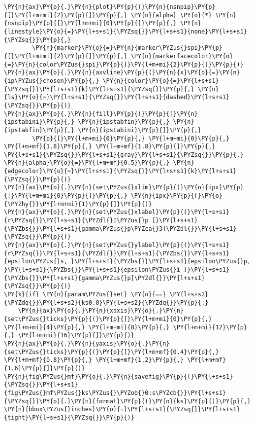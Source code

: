 \begin{Verbatim}[commandchars=\\\{\}]
\PY{n}{ax}\PY{o}{.}\PY{n}{plot}\PY{p}{(}\PY{n}{nsnpip}\PY{p}{[}\PY{l+m+mi}{2}\PY{p}{]}\PY{p}{,} \PY{n}{alpha} \PY{o}{*} \PY{n}{nsnpip}\PY{p}{[}\PY{l+m+mi}{0}\PY{p}{]}\PY{p}{,} \PY{n}{linestyle}\PY{o}{=}\PY{l+s+s1}{\PYZsq{}}\PY{l+s+s1}{none}\PY{l+s+s1}{\PYZsq{}}\PY{p}{,}
        \PY{n}{marker}\PY{o}{=}\PY{n}{marker\PYZus{}spi}\PY{p}{[}\PY{l+m+mi}{2}\PY{p}{]}\PY{p}{,} \PY{n}{markerfacecolor}\PY{o}{=}\PY{n}{color\PYZus{}spi}\PY{p}{[}\PY{l+m+mi}{2}\PY{p}{]}\PY{p}{)}
\PY{n}{ax}\PY{o}{.}\PY{n}{axvline}\PY{p}{(}\PY{n}{x}\PY{o}{=}\PY{n}{ip\PYZus{}chosen}\PY{p}{,} \PY{n}{color}\PY{o}{=}\PY{l+s+s1}{\PYZsq{}}\PY{l+s+s1}{k}\PY{l+s+s1}{\PYZsq{}}\PY{p}{,} \PY{n}{ls}\PY{o}{=}\PY{l+s+s1}{\PYZsq{}}\PY{l+s+s1}{dashed}\PY{l+s+s1}{\PYZsq{}}\PY{p}{)}
\PY{n}{ax}\PY{o}{.}\PY{n}{fill}\PY{p}{(}\PY{p}{[}\PY{n}{ipstabini}\PY{p}{,} \PY{n}{ipstabfin}\PY{p}{,} \PY{n}{ipstabfin}\PY{p}{,} \PY{n}{ipstabini}\PY{p}{]}\PY{p}{,}
        \PY{p}{[}\PY{l+m+mi}{0}\PY{p}{,} \PY{l+m+mi}{0}\PY{p}{,} \PY{l+m+mf}{1.8}\PY{p}{,} \PY{l+m+mf}{1.8}\PY{p}{]}\PY{p}{,} \PY{l+s+s1}{\PYZsq{}}\PY{l+s+s1}{gray}\PY{l+s+s1}{\PYZsq{}}\PY{p}{,} \PY{n}{alpha}\PY{o}{=}\PY{l+m+mf}{0.5}\PY{p}{,} \PY{n}{edgecolor}\PY{o}{=}\PY{l+s+s1}{\PYZsq{}}\PY{l+s+s1}{k}\PY{l+s+s1}{\PYZsq{}}\PY{p}{)}
\PY{n}{ax}\PY{o}{.}\PY{n}{set\PYZus{}xlim}\PY{p}{(}\PY{n}{ipx}\PY{p}{[}\PY{l+m+mi}{0}\PY{p}{]}\PY{p}{,} \PY{n}{ipx}\PY{p}{[}\PY{o}{\PYZhy{}}\PY{l+m+mi}{1}\PY{p}{]}\PY{p}{)}
\PY{n}{ax}\PY{o}{.}\PY{n}{set\PYZus{}xlabel}\PY{p}{(}\PY{l+s+s1}{r\PYZsq{}}\PY{l+s+s1}{\PYZdl{}I\PYZus{}p [}\PY{l+s+s1}{\PYZbs{}}\PY{l+s+s1}{gamma\PYZus{}p\PYZca{}3]\PYZdl{}}\PY{l+s+s1}{\PYZsq{}}\PY{p}{)}
\PY{n}{ax}\PY{o}{.}\PY{n}{set\PYZus{}ylabel}\PY{p}{(}\PY{l+s+s1}{r\PYZsq{}}\PY{l+s+s1}{\PYZdl{}}\PY{l+s+s1}{\PYZbs{}}\PY{l+s+s1}{epsilon\PYZus{}s, }\PY{l+s+s1}{\PYZbs{}}\PY{l+s+s1}{epsilon\PYZus{}p, }\PY{l+s+s1}{\PYZbs{}}\PY{l+s+s1}{epsilon\PYZus{}i [}\PY{l+s+s1}{\PYZbs{}}\PY{l+s+s1}{gamma\PYZus{}p]\PYZdl{}}\PY{l+s+s1}{\PYZsq{}}\PY{p}{)}
\PY{k}{if} \PY{n}{param\PYZus{}set} \PY{o}{==} \PY{l+s+s2}{\PYZdq{}}\PY{l+s+s2}{ks0.0}\PY{l+s+s2}{\PYZdq{}}\PY{p}{:}
    \PY{n}{ax}\PY{o}{.}\PY{n}{xaxis}\PY{o}{.}\PY{n}{set\PYZus{}ticks}\PY{p}{(}\PY{p}{[}\PY{l+m+mi}{0}\PY{p}{,} \PY{l+m+mi}{4}\PY{p}{,} \PY{l+m+mi}{8}\PY{p}{,} \PY{l+m+mi}{12}\PY{p}{,} \PY{l+m+mi}{16}\PY{p}{]}\PY{p}{)}
\PY{n}{ax}\PY{o}{.}\PY{n}{yaxis}\PY{o}{.}\PY{n}{set\PYZus{}ticks}\PY{p}{(}\PY{p}{[}\PY{l+m+mf}{0.4}\PY{p}{,} \PY{l+m+mf}{0.8}\PY{p}{,} \PY{l+m+mf}{1.2}\PY{p}{,} \PY{l+m+mf}{1.6}\PY{p}{]}\PY{p}{)}
\PY{n}{fig\PYZus{}mf}\PY{o}{.}\PY{n}{savefig}\PY{p}{(}\PY{l+s+s1}{\PYZsq{}}\PY{l+s+s1}{fig\PYZus{}mf\PYZus{}ks\PYZus{}\PYZob{}0:s\PYZcb{}}\PY{l+s+s1}{\PYZsq{}}\PY{o}{.}\PY{n}{format}\PY{p}{(}\PY{n}{ks}\PY{p}{)}\PY{p}{,} \PY{n}{bbox\PYZus{}inches}\PY{o}{=}\PY{l+s+s1}{\PYZsq{}}\PY{l+s+s1}{tight}\PY{l+s+s1}{\PYZsq{}}\PY{p}{)}

\end{Verbatim}
